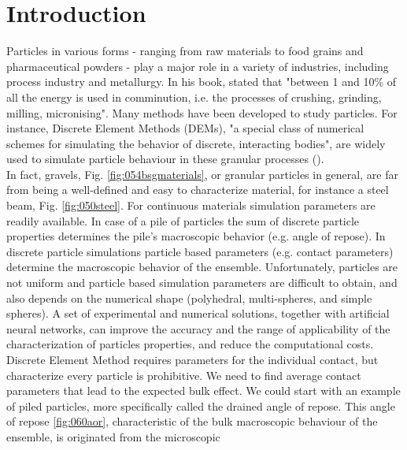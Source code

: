 
\part{Introduction}
\label{par:introduction}

Particles in various forms - ranging from raw materials to food grains and pharmaceutical powders - 
play a major role in a variety of industries, including process industry and metallurgy. 
In his book, \citet{RefWorks:117} stated that "between 1 and 10\% of all the energy is used in 
comminution, i.e. the processes of crushing, grinding, milling, micronising". 
Many methods have been developed to study particles.
For instance, Discrete Element Methods (\acs{DEMs}), "a special class of numerical
schemes for simulating the behavior of discrete, interacting bodies", are widely used to 
simulate particle behaviour in these granular processes
(\citet{RefWorks:130}).\\ 


In fact, gravels, Fig. \ref{fig:054bsgmaterials}, or granular particles in
general, are far from being a well-defined and easy to characterize material,
for instance a steel beam, Fig.
\ref{fig:050steel}. For continuous materials simulation
parameters are readily available.
In case of a pile of particles the sum of discrete particle properties determines the pile's macroscopic behavior 
(e.g. angle of repose).
In discrete particle simulations particle based parameters (e.g. contact parameters) determine the macroscopic behavior 
of the ensemble.
Unfortunately, particles are not uniform and particle based simulation
parameters are difficult to obtain, and also depends on the numerical shape
(polyhedral, multi-spheres, and simple spheres).
A set of experimental and numerical solutions, together with artificial neural networks, can improve the accuracy 
and the range of applicability of the characterization of particles properties, and reduce the computational costs.
Discrete Element Method requires parameters for the individual contact, but characterize every particle is prohibitive.
We need to find average contact parameters that lead to the expected bulk effect.
We could start with an example of piled particles, more specifically called the
drained angle of repose. This angle of repose \ref{fig:060aor},
characteristic of the bulk macroscopic behaviour of the ensemble, is originated from the microscopic
